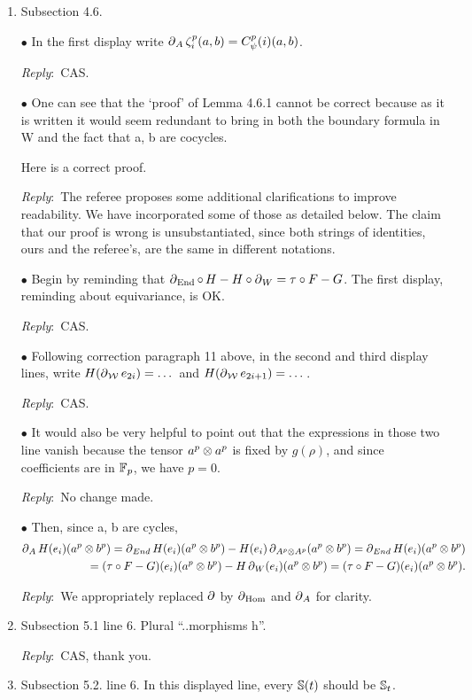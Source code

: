 \documentclass{amsart}
\newcommand{\ar}{\medskip\noindent\textit{Reply}:\ }
\def\subitem{\medskip\noindent$\bullet$ }
\begin{document}
\begin{enumerate}
	\item Subsection 4.6.

	\subitem In the first display write $\operatorname{\partial}_A \zeta_i^p(a,b) = C_\psi^p(i)(a, b)$.

	\ar CAS.

	\subitem One can see that the ‘proof’ of Lemma 4.6.1 cannot be correct because as it is written it
	would seem redundant to bring in both the boundary formula in W and the fact that a, b
	are cocycles.

	\medskip\noindent Here is a correct proof.

	\ar The referee proposes some additional clarifications to improve readability.
	We have incorporated some of those as detailed below.
	The claim that our proof is wrong is unsubstantiated, since both strings of identities, ours and the referee's, are the same in different notations.

	\subitem Begin by reminding that $\operatorname{\partial}_{\mathrm{End}} \mathbin{\circ}\, H - H \mathbin{\circ} \operatorname{\partial}_{W} = \tau \mathbin{\circ} F - G$.
	The first display, reminding about equivariance, is OK.

	\ar CAS.

	\subitem Following correction paragraph 11 above, in the second and third display lines, write $H(\operatorname{\partial}_{\mathcal{W}} e_{2i}) = \dots$ and $H(\operatorname{\partial}_{\mathcal{W}} e_{2i+1}) = \dots$.

	\ar CAS.

	\subitem It would also be very helpful to point out that the expressions in those two line vanish
	because the tensor $a^p \otimes a^p$ is fixed by $g(\rho)$, and since coefficients are in ${\mathbb{F}_p}$, we have $p = 0$.

	\ar No change made.

	\subitem Then, since a, b are cycles,
	\[
	\begin{split}
		\operatorname{\partial}_A H(e_i)(a^p \otimes b^p) = \operatorname{\partial}_{End} H(e_i)(a^p \otimes b^p) - H(e_i)\operatorname{\partial}_{A^p \otimes A^p} (a^p \otimes b^p) = \operatorname{\partial}_{End} H(e_i)(a^p \otimes b^p) \\
		= (\tau \mathbin{\circ} F - G)(e_i)(a^p \otimes b^p) - H\operatorname{\partial}_W (e_i)(a^p \otimes b^p) = (\tau \mathbin{\circ} F - G)(e_i )(a^p \otimes b^p).
	\end{split}
	\]

	\ar We appropriately replaced $\operatorname{\partial}$ by $\operatorname{\partial}_{\mathrm{Hom}}$ and $\operatorname{\partial}_A$ for clarity.

	\item Subsection 5.1 line 6. Plural “..morphisms h”.

	\ar CAS, thank you.

	\item Subsection 5.2. line 6. In this displayed line, every $\mathbb{S}(t)$ should be $\mathbb{S}_t$.


\end{enumerate}
\end{document}
